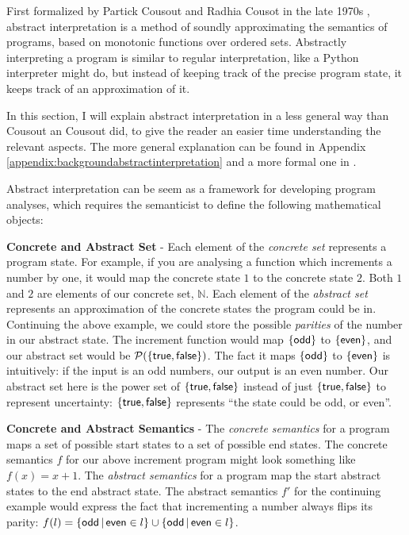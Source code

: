 \documentclass[12pt,twoside]{report}
\begin{document}
First formalized by Partick Cousout and Radhia Cousot in the late 1970s \citep{cousotAbstractInterpretationUnified1977}, abstract interpretation is a method of soundly approximating the semantics of programs, based on monotonic functions over ordered sets. Abstractly interpreting a program is similar to regular interpretation, like a Python interpreter might do, but instead of keeping track of the precise program state, it keeps track of an approximation of it.

In this section, I will explain abstract interpretation in a less general way than Cousout an Cousout did, to give the reader an easier time understanding the relevant aspects. The more general explanation can be found in Appendix \ref{appendix:backgroundabstractinterpretation} and a more formal one in \cite{blanchetIntroductionAbstractInterpretation}.

Abstract interpretation can be seem as a framework for developing program analyses, which requires the semanticist to define the following mathematical objects:

\textbf{Concrete and Abstract Set} - Each element of the \textit{concrete set} represents a program state. For example, if you are analysing a function which increments a number by one, it would map the concrete state $1$ to the concrete state $2$. Both $1$ and $2$ are  elements of our concrete set, $\mathbb{N}$. Each element of the \textit{abstract set} represents an approximation of the concrete states the program could be in. Continuing the above example, we could store the possible \textit{parities} of the number in our abstract state. The increment function would map $\{ \mathsf{odd} \}$ to $\{ \mathsf{even} \}$, and our abstract set would be $\mathcal{P}({\{ \mathsf{true}, \mathsf{false} \}})$. The fact it maps $\{ \mathsf{odd} \}$ to $\{ \mathsf{even} \}$ is intuitively: if the input is an odd numbers, our output is an even number. Our abstract set here is the power set of ${\{ \mathsf{true}, \mathsf{false} \}}$ instead of just ${\{ \mathsf{true}, \mathsf{false} \}}$ to represent uncertainty: $\{ \mathsf{true}, \mathsf{false} \}$ represents ``the state could be odd, or even''.

\textbf{Concrete and Abstract Semantics} - The \textit{concrete semantics} for a program maps a set of possible start states to a set of possible end states. The concrete semantics $f$ for our above increment program might look something like $f (x) = x + 1$. The \textit{abstract semantics} for a program map the start abstract states to the end abstract state. The abstract semantics $f'$ for the continuing example would express the fact that incrementing a number always flips its parity: $f (l) = \{ \mathsf{odd} \,|\, \mathsf{even} \in l \} \cup \{ \mathsf{odd} \,|\, \mathsf{even} \in l \}$.
\end{document}
